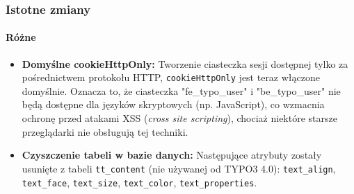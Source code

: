 \begin{frame}[fragile]
	\frametitle{Istotne zmiany}
	\framesubtitle{Różne}

	\begin{itemize}

		\item \textbf{Domyślne cookieHttpOnly:}\newline
			\small
				Tworzenie ciasteczka sesji dostępnej tylko za pośrednictwem protokołu HTTP, \texttt{cookieHttpOnly} jest teraz włączone domyślnie.\newline
				Oznacza to, że ciasteczka "fe\_typo\_user" i "be\_typo\_user" nie będą dostępne dla języków skryptowych (np. JavaScript), co wzmacnia ochronę przed atakami XSS (\textit{cross site scripting}), chociaż niektóre starsze przeglądarki nie obsługują tej techniki.
			\normalsize

		\item \textbf{Czyszczenie tabeli w bazie danych:}\newline
			\small
				Następujące atrybuty zostały usunięte z tabeli \texttt{tt\_content} (nie używanej od TYPO3 4.0):
				\texttt{text\_align}, \texttt{text\_face}, \texttt{text\_size}, \texttt{text\_color}, \texttt{text\_properties}.
			\normalsize

	\end{itemize}
	
\end{frame}


